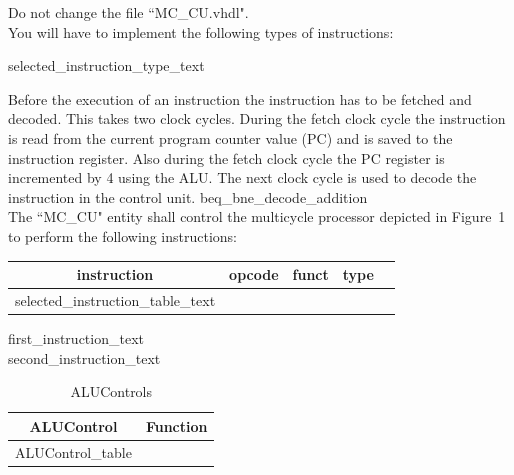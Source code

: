 \documentclass[a4paper,12pt]{article}
\newcommand\Tstrut{\rule{0pt}{2.6ex}}       %
\begin{document}
\begin{center}
\end{center}

Do not change the file ``MC\_CU.vhdl".\\

You will have to implement the following types of instructions:

{{selected_instruction_type_text}}

Before the execution of an instruction the instruction has to be fetched and decoded. This takes two clock cycles. During the fetch clock cycle the instruction is read from the current program counter value (PC) and is saved to the instruction register. Also during the fetch clock cycle the PC register is incremented by 4 using the ALU. The next clock cycle is used to decode the instruction in the control unit. {{beq_bne_decode_addition}} \\

The ``MC\_CU" entity shall control the multicycle processor depicted in Figure~1 to perform the following instructions:

\begin{table}[h!]
\centering
    \begin{tabular}{|c|c|c|c|c|} \hline \Tstrut
		instruction & opcode  & funct & type   \\ \hline \Tstrut
		{{selected_instruction_table_text}}
    \hline
    \end{tabular}
\end{table}

{{first_instruction_text}} \\

{{second_instruction_text}} \\

\begin{table}[h!]
\centering
    \begin{tabular}{|c|c|} \hline \Tstrut
		ALUControl & Function   \\ \hline \Tstrut
		{{ALUControl_table}}
    \hline
    \end{tabular}
    \caption{ALUControls}
    \label{tab:ALUControls}
\end{table}
\end{document}
